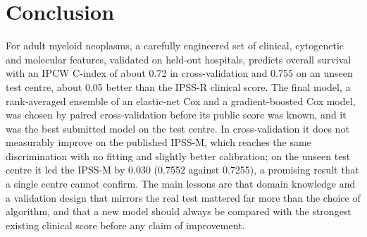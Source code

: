 \documentclass[11pt,a4paper]{article}
\begin{document}
\section{Conclusion}
For adult myeloid neoplasms, a carefully engineered set of clinical, cytogenetic and
molecular features, validated on held-out hospitals, predicts overall survival with an IPCW
C-index of about 0.72 in cross-validation and 0.755 on an unseen test centre, about 0.05
better than the IPSS-R clinical score. The final model, a rank-averaged ensemble of an
elastic-net Cox and a gradient-boosted Cox model, was chosen by paired cross-validation
before its public score was known, and it was the best submitted model on the test centre.
In cross-validation it does not measurably improve on the published IPSS-M, which reaches
the same discrimination with no fitting and slightly better calibration; on the unseen test
centre it led the IPSS-M by 0.030 (0.7552 against 0.7255), a promising result that a single
centre cannot confirm. The main lessons are that
domain knowledge and a validation design that mirrors the real test mattered far more than
the choice of algorithm, and that a new model should always be compared with the strongest
existing clinical score before any claim of improvement.
\end{document}
